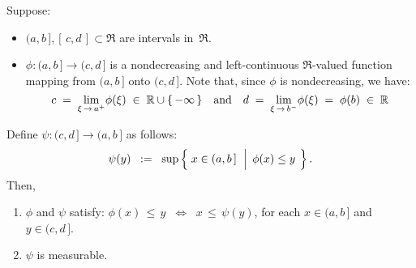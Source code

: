 
\begin{lemma}
\mbox{}\vskip 0.1cm
\noindent
Suppose:
\begin{itemize}
\item
	$(a,b\,], [\,c,d\,] \subset \Re$ are intervals in \,$\Re$.
\item
	$\phi : (a,b\,] \longrightarrow (c,d\,]$ is a nondecreasing and left-continuous
	$\Re$-valued function mapping from $(a,b\,]$ {\color{red}onto} $(c,d\,]$.
	Note that, since $\phi$ is nondecreasing, we have:
	\begin{equation*}
	c \; = \; \underset{\xi\,\rightarrow\,a^{+}}{\lim}\phi(\xi) \; \in \; \Re\cup\{\,-\infty\,\}
	\quad\textnormal{and}\quad
	d \; = \; \underset{\xi\,\rightarrow\,b^{-}}{\lim}\phi(\xi) \; = \; \phi(b) \; \in \; \Re
	\end{equation*}
\end{itemize}
Define \;$\psi : (c,d\,] \longrightarrow (a,b\,]$\; as follows:
\begin{equation*}
\psi(y)
\;\; := \;\;
	\sup\left\{\;
		x \in (a,b\,]
	\,\;\left\vert\;\,
		\overset{{\color{white}.}}{\phi}(x) \leq y
	\right.
	\;\right\}.
\end{equation*}
Then,
\begin{enumerate}
\item
	$\phi$ and $\psi$ satisfy:\quad
	$\phi(x) \,\leq\, y \;\; \Longleftrightarrow \;\; x \,\leq\, \psi(y)$,\;\;
	for each \;$x \in (a,b\,]$\; and \;$y \in (c,d\,]$.
\item
	$\psi$ is measurable.
\end{enumerate}
\end{lemma}
\proof
